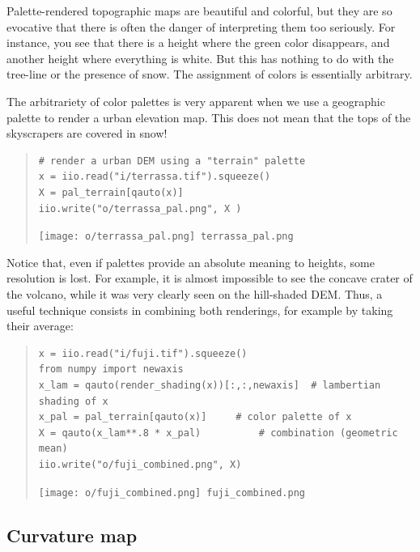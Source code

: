 Palette-rendered topographic maps are beautiful and colorful, but they are so
evocative that there is often the danger of interpreting them too seriously.
For instance, you see that there is a height where the green color
disappears, and another height where everything is white.  But this has
nothing to do with the tree-line or the presence of snow.  The assignment of
colors is essentially arbitrary.


\begin{samepage}
The arbitrariety of color palettes is very apparent when we use a
geographic palette to render a urban elevation map.  This does not mean that
the tops of the skyscrapers are covered in snow!

\begin{quote}
\begin{verbatim}
# render a urban DEM using a "terrain" palette
x = iio.read("i/terrassa.tif").squeeze()
X = pal_terrain[qauto(x)]
iio.write("o/terrassa_pal.png", X )
\end{verbatim}
\texttt{[image: o/terrassa\_pal.png]}~\verb+terrassa_pal.png+
\end{quote}
\end{samepage}


Notice that, even if palettes provide an absolute meaning to heights, some
resolution is lost.  For example, it is almost impossible to see the concave
crater of the volcano, while it was very clearly seen on the hill-shaded DEM.
Thus, a useful technique consists in combining both renderings, for example
by taking their average:

\begin{quote}
\begin{verbatim}
x = iio.read("i/fuji.tif").squeeze()
from numpy import newaxis
x_lam = qauto(render_shading(x))[:,:,newaxis]  # lambertian shading of x
x_pal = pal_terrain[qauto(x)]     # color palette of x
X = qauto(x_lam**.8 * x_pal)          # combination (geometric mean)
iio.write("o/fuji_combined.png", X)
\end{verbatim}
\texttt{[image: o/fuji\_combined.png]}~\verb+fuji_combined.png+
\end{quote}



%
%

\clearpage
\subsection{Curvature map}

